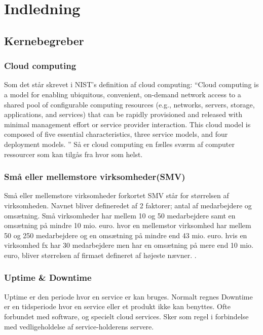 \chapter{Indledning}
\section{Kernebegreber}
\subsection{Cloud computing}
Som det står skrevet i NIST’s definition af cloud computing: “Cloud computing is a model for enabling ubiquitous, convenient, on-demand network access to a shared pool of configurable computing resources (e.g., networks, servers, storage, applications, and services) that can be rapidly provisioned and released with minimal management effort or service provider interaction. This cloud model is composed of five essential characteristics, three service models, and four deployment models. \citep{cloud_def}” Så er cloud  computing en fælles sværm af computer ressourcer som kan tilgås fra hvor som helst.\\

\subsection{Små eller mellemstore virksomheder(SMV)}
Små eller mellemstore virksomheder forkortet SMV står for størrelsen af virksomheden. Navnet bliver defineredet af 2 faktorer; antal af medarbejdere og omsætning. Små virksomheder har mellem 10 og 50 medarbejdere samt en omsætning på mindre 10 mio. euro. hvor en mellemstor virksomhed har mellem 50 og 250 medarbejdere og en omsætning på mindre end 43 mio. euro. hvis en virksomhed fx har 30 medarbejdere men har en omsætning på mere end 10 mio. euro, bliver størrelsen af firmaet defineret af højeste nævner. \citep{smvdef}.

\subsection{Uptime & Downtime}
Uptime er den periode hvor en service er kan bruges. Normalt regnes  Downtime er en tidsperiode hvor en service eller et produkt ikke kan benyttes. Ofte forbundet med software, og specielt cloud services. Sker som regel i forbindelse med vedligeholdelse af service-holderens servere. 